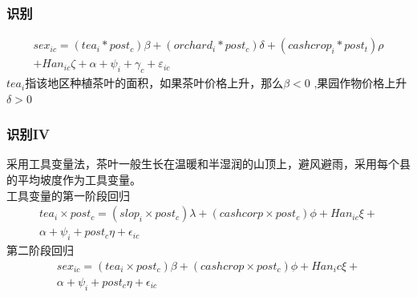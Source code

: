 \documentclass{beamer}
\begin{document}
\begin{frame}
    \frametitle{识别}
\begin{equation}
\begin{aligned}    
sex_{ic}=(tea_i*post_c)\beta+(orchard_i*post_c)\delta+ (cashcrop_i*post_t)\rho\\
+Han_{ic}\zeta +\alpha+\psi_i+\gamma_c+\varepsilon_{ic}
\end{aligned}
\end{equation}
$tea_i$指该地区种植茶叶的面积，如果茶叶价格上升，那么$\beta<0$ ,果园作物价格上升$\delta>0$

\end{frame}






\begin{frame}
   \frametitle{识别IV} 
采用工具变量法，茶叶一般生长在温暖和半湿润的山顶上，避风避雨，采用每个县的平均坡度作为工具变量。
\\工具变量的第一阶段回归
\begin{equation}
    \begin{aligned}
         tea_i \times post_c=(slop_i \times post_c)\lambda+(cashcorp\times post_c)\phi+Han_{ic}\xi+ \\
        \alpha +\psi_{i}+post_c\eta+ \epsilon_{ic} 
    \end{aligned}
 \end{equation} 
 第二阶段回归
 \begin{equation}
    \begin{aligned}
sex_{ic}=(tea_i \times post_c)\beta +(cashcrop \times post_c)\phi +Han_ic \xi + \\ \alpha +\psi_{i}+post_c\eta+ \epsilon_{ic} 
    \end{aligned}
 \end{equation} 
\end{frame}
\end{document}
